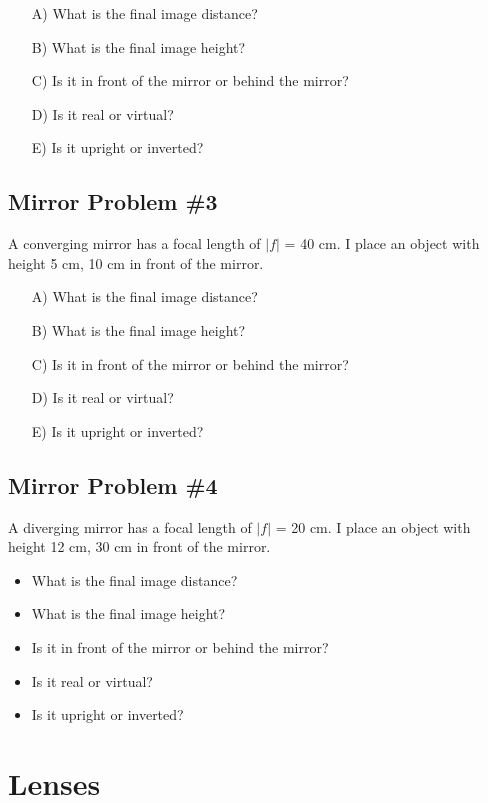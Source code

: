 \documentclass[11pt]{article}
\begin{document}
\begin{itemize}
\item[A)] What is the final image distance?
\item[B)] What is the final image height?
\item[C)] Is it in front of the mirror or behind the mirror?  
\item[D)] Is it real or virtual?
\item[E)] Is it upright or inverted?
\end{itemize}

\subsection{Mirror Problem \#3}
A converging mirror has a focal length of $|f|$ = 40 cm.  I place an object with height 5 cm, 10 cm in front of the mirror.  

\begin{itemize}
\item[A)] What is the final image distance?
\item[B)] What is the final image height?
\item[C)] Is it in front of the mirror or behind the mirror?  
\item[D)] Is it real or virtual?
\item[E)] Is it upright or inverted?
\end{itemize}

\subsection{Mirror Problem \#4}
A diverging mirror has a focal length of $|f|$ = 20 cm.  I place an object with height 12 cm, 30 cm in front of the mirror.  

\begin{itemize}
\item What is the final image distance?
\item What is the final image height?
\item Is it in front of the mirror or behind the mirror?  
\item Is it real or virtual?
\item Is it upright or inverted?
\end{itemize}

\pagebreak
\section{Lenses}
\end{document}
